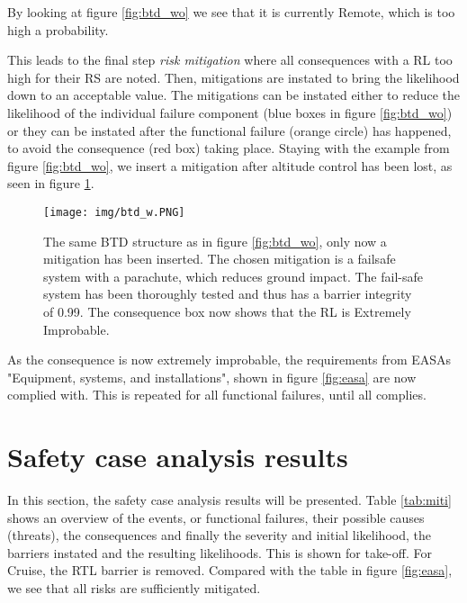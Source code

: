 \documentclass[10pt,a4paper]{report}
\begin{document}
By looking at figure \ref{fig:btd_wo} we see that it is currently Remote, which is too high a probability.

This leads to the final step \textit{risk mitigation} where all consequences with a RL too high for their RS are noted. Then, mitigations are instated to bring the likelihood down to an acceptable value. The mitigations can be instated either to reduce the likelihood of the individual failure component (blue boxes in figure \ref{fig:btd_wo}) or they can be instated after the functional failure (orange circle) has happened, to avoid the consequence (red box) taking place. Staying with the example from figure \ref{fig:btd_wo}, we insert a mitigation after altitude control has been lost, as seen in figure \ref{fig:btd_w}.

\begin{figure}[h!]
    \centering
    \texttt{[image: img/btd\_w.PNG]}
    \caption{The same BTD structure as in figure \ref{fig:btd_wo}, only now a mitigation has been inserted. The chosen mitigation is a failsafe system with a parachute, which reduces ground impact. The fail-safe system has been thoroughly tested and thus has a barrier integrity of 0.99. The consequence box now shows that the RL is Extremely Improbable.}
    \label{fig:btd_w}
\end{figure}

As the consequence is now extremely improbable, the requirements from EASAs "Equipment, systems, and installations", shown in figure \ref{fig:easa} are now complied with. This is repeated for all functional failures, until all complies.

\section{Safety case analysis results}
In this section, the safety case analysis results will be presented. Table \ref{tab:miti} shows an overview of the events, or functional failures, their possible causes (threats), the consequences and finally the severity and initial likelihood, the barriers instated and the resulting likelihoods. This is shown for take-off. For Cruise, the RTL barrier is removed. Compared with the table in figure \ref{fig:easa}, we see that all risks are sufficiently mitigated.
\end{document}
